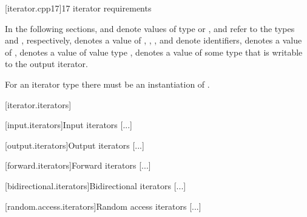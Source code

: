 \begin{addedblock}

{\color{newclr}
[iterator.cpp17]{\Cpp{}17 iterator requirements}

\pnum
In the following sections,
and
denote values of type
 or ,
 and  refer to the
types  and
, respectively,
denotes a value of
,
,
,
and
denote identifiers,
denotes a value of
,
denotes a value of value type
,
denotes a value of some type that is writable to the output iterator.
\begin{note} For an iterator type  there must be an instantiation
of . \end{note}
} %
\end{addedblock}

[iterator.iterators]{}

[input.iterators]{Input iterators}
[...]

[output.iterators]{Output iterators}
[...]

[forward.iterators]{Forward iterators}
[...]

[bidirectional.iterators]{Bidirectional iterators}
[...]

[random.access.iterators]{Random access iterators}
[...]

